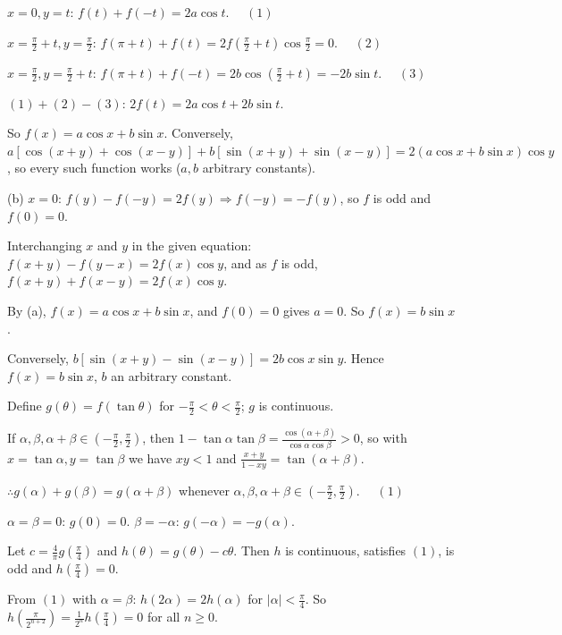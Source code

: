   $x = 0, y = t$: $f(t) + f(-t) = 2a\cos t$. $\quad (1)$

  $x = \frac{\pi}{2} + t, y = \frac{\pi}{2}$: $f(\pi + t) + f(t) = 2f\left(\frac{\pi}{2} + t\right)\cos\frac{\pi}{2}
  = 0$. $\quad (2)$

  $x = \frac{\pi}{2}, y = \frac{\pi}{2} + t$: $f(\pi + t) + f(-t) = 2b\cos\left(\frac{\pi}{2} + t\right) = -2b\sin
  t$. $\quad (3)$

  $(1) + (2) - (3)$: $2f(t) = 2a\cos t + 2b\sin t$.

  So $f(x) = a\cos x + b\sin x$. Conversely, $a[\cos(x + y) + \cos(x - y)] + b[\sin(x + y) + \sin(x - y)] = 2(a\cos x
  + b\sin x)\cos y$, so every such function works ($a, b$ arbitrary constants).

  (b) $x = 0$: $f(y) - f(-y) = 2f(y)\Rightarrow f(-y) = -f(y)$, so $f$ is odd and $f(0) = 0$.

  Interchanging $x$ and $y$ in the given equation: $f(x + y) - f(y - x) = 2f(x)\cos y$, and as $f$ is odd, $f(x + y) +
  f(x - y) = 2f(x)\cos y$.

  By (a), $f(x) = a\cos x + b\sin x$, and $f(0) = 0$ gives $a = 0$. So $f(x) = b\sin x$.

  Conversely, $b[\sin(x + y) - \sin(x - y)] = 2b\cos x\sin y$. Hence $f(x) = b\sin x$, $b$ an arbitrary constant.
\item Define $g(\theta) = f(\tan\theta)$ for $-\frac{\pi}{2} < \theta < \frac{\pi}{2}$; $g$ is continuous.

  If $\alpha, \beta, \alpha + \beta\in\left(-\frac{\pi}{2}, \frac{\pi}{2}\right)$, then $1 - \tan\alpha\tan\beta =
  \frac{\cos(\alpha + \beta)}{\cos\alpha\cos\beta} > 0$, so with $x = \tan\alpha, y = \tan\beta$ we have $xy < 1$ and
  $\frac{x + y}{1 - xy} = \tan(\alpha + \beta)$.

  $\therefore g(\alpha) + g(\beta) = g(\alpha + \beta)$ whenever $\alpha, \beta, \alpha + \beta\in
  \left(-\frac{\pi}{2}, \frac{\pi}{2}\right)$. $\quad (1)$

  $\alpha = \beta = 0$: $g(0) = 0$. $\beta = -\alpha$: $g(-\alpha) = -g(\alpha)$.

  Let $c = \frac{4}{\pi}g\left(\frac{\pi}{4}\right)$ and $h(\theta) = g(\theta) - c\theta$. Then $h$ is continuous,
  satisfies $(1)$, is odd and $h\left(\frac{\pi}{4}\right) = 0$.

  From $(1)$ with $\alpha = \beta$: $h(2\alpha) = 2h(\alpha)$ for $|\alpha| < \frac{\pi}{4}$. So
  $h\left(\frac{\pi}{2^{n + 2}}\right) = \frac{1}{2^n}h\left(\frac{\pi}{4}\right) = 0$ for all $n\ge 0$.

